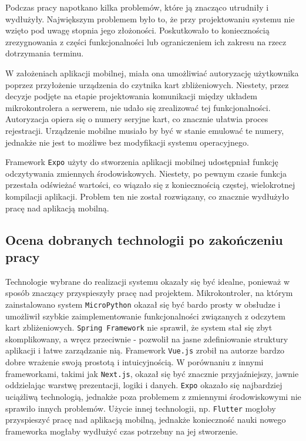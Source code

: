 Podczas pracy napotkano kilka problemów, które ją znacząco utrudniły i wydłużyły. Największym problemem było to, że przy projektowaniu systemu nie wzięto pod uwagę stopnia jego złożoności. Poskutkowało to koniecznością zrezygnowania z części funkcjonalności lub ograniczeniem ich zakresu na rzecz dotrzymania terminu.

W założeniach aplikacji mobilnej, miała ona umożliwiać autoryzację użytkownika poprzez przyłożenie urządzenia do czytnika kart zbliżeniowych. Niestety, przez decyzje podjęte na etapie projektowania komunikacji między układem mikrokontrolera a serwerem, nie udało się zrealizować tej funkcjonalności. Autoryzacja opiera się o numery seryjne kart, co znacznie ułatwia proces rejestracji. Urządzenie mobilne musiało by być w stanie emulować te numery, jednakże nie jest to możliwe bez modyfikacji systemu operacyjnego.

Framework \texttt{Expo} użyty do stworzenia aplikacji mobilnej udostępniał funkcję odczytywania zmiennych środowiskowych. Niestety, po pewnym czasie funkcja przestała odświeżać wartości, co wiązało się z koniecznością częstej, wielokrotnej kompilacji aplikacji. Problem ten nie został rozwiązany, co znacznie wydłużyło pracę nad aplikacją mobilną.

\subsection{Ocena dobranych technologii po zakończeniu pracy}

Technologie wybrane do realizacji systemu okazały się być idealne, ponieważ w sposób znaczący przyspieszyły pracę nad projektem. Mikrokontroler, na którym zainstalowano system \texttt{MicroPython} okazał się być bardo prosty w obsłudze i umożliwił szybkie zaimplementowanie funkcjonalności związanych z odczytem kart zbliżeniowych. \texttt{Spring Framework} nie sprawił, że system stał się zbyt skomplikowany, a wręcz przeciwnie - pozwolił na jasne zdefiniowanie struktury aplikacji i łatwe zarządzanie nią. Framework \texttt{Vue.js} zrobił na autorze bardzo dobre wrażenie swoją prostotą i intuicyjnością. W porównaniu z innymi frameworkami, takimi jak \texttt{Next.js}, okazał się być znacznie przyjaźniejszy, jawnie oddzielając warstwę prezentacji, logiki i danych. \texttt{Expo} okazało się najbardziej uciążliwą technologią, jednakże poza problemem z zmiennymi środowiskowymi nie sprawiło innych problemów. Użycie innej technologii, np. \texttt{Flutter} mogłoby przyspieszyć pracę nad aplikacją mobilną, jednakże konieczność nauki nowego frameworka mogłaby wydłużyć czas potrzebny na jej stworzenie.

